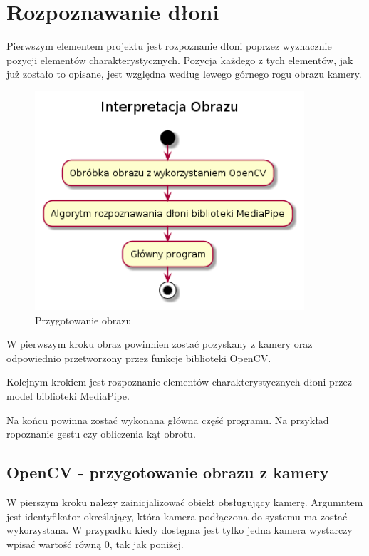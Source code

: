 \section{Rozpoznawanie dłoni}

\quad Pierwszym elementem projektu jest rozpoznanie dłoni poprzez wyznacznie pozycji elementów charakterystycznych. Pozycja każdego z tych elementów, jak już zostało to opisane, jest względna według lewego górnego rogu obrazu kamery. 

\begin{figure}[H]
    \begin{center}
        \includegraphics[width=10cm]{../images/image_processing.png}
        \caption{Przygotowanie obrazu}
    \end{center}
\end{figure}

\quad W pierwszym kroku obraz powinnien zostać pozyskany z kamery oraz odpowiednio przetworzony przez funkcje biblioteki OpenCV. 

\quad Kolejnym krokiem jest rozpoznanie elementów charakterystycznych dłoni przez model biblioteki MediaPipe. 

\quad Na końcu powinna zostać wykonana główna część programu. Na przykład ropoznanie gestu czy obliczenia kąt obrotu. 

\subsection{OpenCV - przygotowanie obrazu z kamery}

\quad W pierszym kroku należy zainicjalizować obiekt obsługujący kamerę. Argumntem jest identyfikator określający, która kamera podłączona do systemu ma zostać wykorzystana. W przypadku kiedy dostępna jest tylko jedna kamera wystarczy wpisać wartość równą 0, tak jak poniżej.\newline


